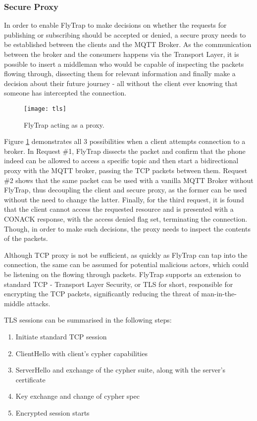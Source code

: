 \subsubsection{Secure Proxy}
In order to enable FlyTrap to make decisions on whether the requests for publishing or subscribing should be accepted or denied, a secure proxy needs to be established between the clients and the MQTT Broker. As the communication between the broker and the consumers happens via the Transport Layer, it is possible to insert a middleman who would be capable of inspecting the packets flowing through, dissecting them for relevant information and finally make a decision about their future journey - all without the client ever knowing that someone has intercepted the connection. 

\begin{figure}[h]
    \centering
    \texttt{[image: tls]}
    \caption{FlyTrap acting as a proxy.}
    \label{fig:tls}
\end{figure}

Figure \ref{fig:tls} demonstrates all 3 possibilities when a client attempts connection to a broker. In Request \#1, FlyTrap dissects the packet and confirm that the phone indeed can be allowed to access a specific topic and then start a bidirectional proxy with the MQTT broker, passing the TCP packets between them. Request \#2 shows that the same packet can be used with a vanilla MQTT Broker without FlyTrap, thus decoupling the client and secure proxy, as the former can be used without the need to change the latter. Finally, for the third request, it is found that the client cannot access the requested resource and is presented with a CONACK response, with the access denied flag set, terminating the connection. Though, in order to make such decisions, the proxy needs to inspect the contents of the packets.

Although TCP proxy is not be sufficient, as quickly as FlyTrap can tap into the connection, the same can be assumed for potential malicious actors, which could be listening on the flowing through packets. FlyTrap supports an extension to standard TCP - Transport Layer Security, or TLS for short, responsible for encrypting the TCP packets, significantly reducing the threat of man-in-the-middle attacks.

TLS sessions can be summarised in the following steps:
\begin{enumerate}
\item Initiate standard TCP session
\item ClientHello with client's cypher capabilities 
\item ServerHello and exchange of the cypher suite, along with the server's certificate
\item Key exchange and change of cypher spec
\item Encrypted session starts
\end{enumerate}

